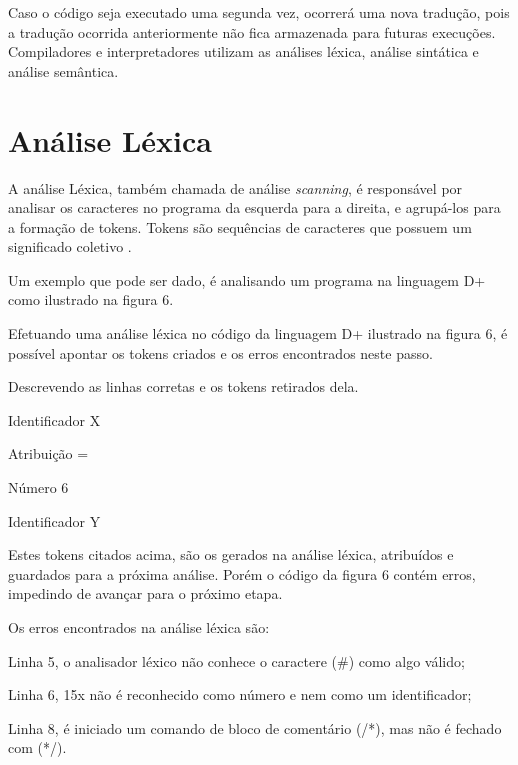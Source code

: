 \documentclass[12pt,oneside,a4paper,chapter=TITLE,section=TITLE,sumario=tradicional]{abntex2}
\begin{document}
Caso o código seja executado uma segunda vez, ocorrerá uma nova tradução, pois a tradução ocorrida anteriormente não fica armazenada para futuras execuções. Compiladores e interpretadores utilizam as análises léxica, análise sintática e análise semântica.

\section{Análise Léxica}
\label{sec:analise-lexica}

A análise Léxica, também chamada de análise \textit{scanning}, é responsável por analisar os caracteres no programa da esquerda para a direita, e agrupá-los para a formação de tokens. Tokens são sequências de caracteres que possuem um significado coletivo \cite{alfred1995}.

Um exemplo que pode ser dado, é analisando um programa na linguagem D+ como ilustrado na figura 6.

\begin{figure}[htb]
\end{figure}

Efetuando uma análise léxica no código da linguagem D+  ilustrado na figura 6, é possível apontar os tokens criados e os erros encontrados neste passo. 

Descrevendo as linhas corretas e os tokens retirados dela.

\begin{lista}
	\item Identificador    X 
	\item Atribuição        = 
	\item Número            6 
	\item Identificador    Y
\end{lista}

Estes tokens citados acima, são os gerados na análise léxica, atribuídos e guardados para a próxima análise. Porém o código da figura 6 contém erros, impedindo de avançar para o próximo etapa.

Os erros encontrados na análise léxica são:

\begin{lista}
	\item Linha 5, o analisador léxico não conhece o caractere (\#) como algo válido;
	\item Linha 6, 15x não é reconhecido como número e nem como um identificador;
	\item Linha 8, é iniciado um comando de bloco de comentário (/*), mas não é fechado com (*/).
\end{lista}
\end{document}
